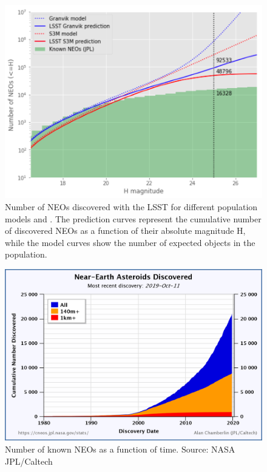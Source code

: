 \begin{figure}[tb!]
\begin{center}
\includegraphics[width=0.65\linewidth]{figs/neo1.png}
\end{center}
\caption{Number of NEOs discovered with the LSST for different population models \citep[S3M,][]{s3m} and \citet{granvik2018neos}. 
The prediction curves represent the cumulative number of discovered NEOs as a function of their absolute magnitude H, while the model curves show the number of expected objects in the population.}
\label{fig:neo_count}       %
\end{figure}

\begin{figure}[tb!]
\begin{center}
\includegraphics[width=0.65\linewidth]{figs/nea_vs_time_chart.png}
\end{center}
\caption{Number of known NEOs as a function of time. Source: NASA JPL/Caltech}
\label{fig:neo_current}       %
\end{figure}

\clearpage

